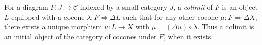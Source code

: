 
For a diagram $F:J\to\mathcal C$ indexed by a small category $J$, a \emph{colimit} of $F$ is an object $L$ equipped with a cocone $\lambda:F\Rightarrow\Delta L$ such that for any other cocone $\mu:F\Rightarrow\Delta X$, there exists a unique morphism $u:L\to X$ with $\mu=(\Delta u)\circ\lambda$. Thus a colimit is an initial object of the category of cocones under $F$, when it exists.
